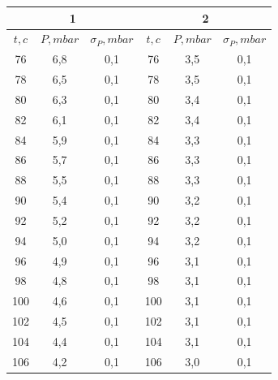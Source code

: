 \documentclass[a4paper, 12pt]{article}%
\begin{document}
\begin{enumerate}
\begin{tabular}{|c|c|c||ccc}
\hline
\multicolumn{3}{|c|}{1} & \multicolumn{3}{c|}{2} \\ \hline
$t, c$ & $P, mbar$ & $\sigma_P, mbar$ & \multicolumn{1}{c|}{$t, c$} & \multicolumn{1}{c|}{$P, mbar$} & \multicolumn{1}{c|}{$\sigma_P, mbar$} \\ \hline
76 & 6,8 & 0,1 & \multicolumn{1}{c|}{76} & \multicolumn{1}{c|}{3,5} & \multicolumn{1}{c|}{0,1} \\ \hline
78 & 6,5 & 0,1 & \multicolumn{1}{c|}{78} & \multicolumn{1}{c|}{3,5} & \multicolumn{1}{c|}{0,1} \\ \hline
80 & 6,3 & 0,1 & \multicolumn{1}{c|}{80} & \multicolumn{1}{c|}{3,4} & \multicolumn{1}{c|}{0,1} \\ \hline
82 & 6,1 & 0,1 & \multicolumn{1}{c|}{82} & \multicolumn{1}{c|}{3,4} & \multicolumn{1}{c|}{0,1} \\ \hline
84 & 5,9 & 0,1 & \multicolumn{1}{c|}{84} & \multicolumn{1}{c|}{3,3} & \multicolumn{1}{c|}{0,1} \\ \hline
86 & 5,7 & 0,1 & \multicolumn{1}{c|}{86} & \multicolumn{1}{c|}{3,3} & \multicolumn{1}{c|}{0,1} \\ \hline
88 & 5,5 & 0,1 & \multicolumn{1}{c|}{88} & \multicolumn{1}{c|}{3,3} & \multicolumn{1}{c|}{0,1} \\ \hline
90 & 5,4 & 0,1 & \multicolumn{1}{c|}{90} & \multicolumn{1}{c|}{3,2} & \multicolumn{1}{c|}{0,1} \\ \hline
92 & 5,2 & 0,1 & \multicolumn{1}{c|}{92} & \multicolumn{1}{c|}{3,2} & \multicolumn{1}{c|}{0,1} \\ \hline
94 & 5,0 & 0,1 & \multicolumn{1}{c|}{94} & \multicolumn{1}{c|}{3,2} & \multicolumn{1}{c|}{0,1} \\ \hline
96 & 4,9 & 0,1 & \multicolumn{1}{c|}{96} & \multicolumn{1}{c|}{3,1} & \multicolumn{1}{c|}{0,1} \\ \hline
98 & 4,8 & 0,1 & \multicolumn{1}{c|}{98} & \multicolumn{1}{c|}{3,1} & \multicolumn{1}{c|}{0,1} \\ \hline
100 & 4,6 & 0,1 & \multicolumn{1}{c|}{100} & \multicolumn{1}{c|}{3,1} & \multicolumn{1}{c|}{0,1} \\ \hline
102 & 4,5 & 0,1 & \multicolumn{1}{c|}{102} & \multicolumn{1}{c|}{3,1} & \multicolumn{1}{c|}{0,1} \\ \hline
104 & 4,4 & 0,1 & \multicolumn{1}{c|}{104} & \multicolumn{1}{c|}{3,1} & \multicolumn{1}{c|}{0,1} \\ \hline
106 & 4,2 & 0,1 & \multicolumn{1}{c|}{106} & \multicolumn{1}{c|}{3,0} & \multicolumn{1}{c|}{0,1} \\ \hline

\end{tabular}
\end{enumerate}
\end{document}
